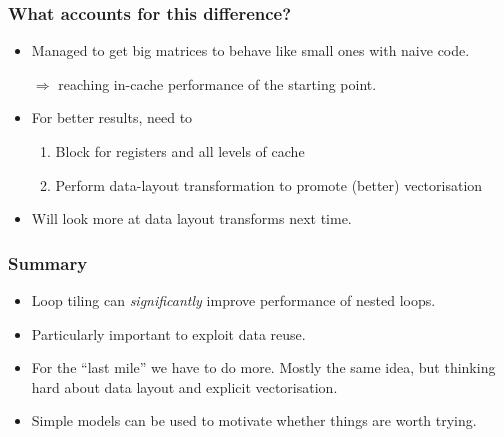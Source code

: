 \documentclass[dvipsnames,presentation,aspectratio=169,14pt]{beamer}
\begin{document}
\begin{frame}
  \frametitle{What accounts for this difference?}
  \begin{itemize}
  \item Managed to get big matrices to behave like small ones with
    naive code.
  \item[$\Rightarrow$] reaching in-cache performance of the starting
    point.
  \item For better results, need to
    \begin{enumerate}
    \item Block for registers and all levels of cache
    \item Perform data-layout transformation to promote (better) vectorisation
    \end{enumerate}
  \item Will look more at data layout transforms next time.
  \end{itemize}
\end{frame}

\begin{frame}
  \frametitle{Summary}
  \begin{itemize}
  \item Loop tiling can \emph{significantly} improve performance of
    nested loops.
  \item Particularly important to exploit data reuse.
  \item For the ``last mile'' we have to do more. Mostly the same
    idea, but thinking hard about data layout and explicit
    vectorisation.
  \item Simple models can be used to motivate whether things are worth trying.
  \end{itemize}
\end{frame}
\end{document}
